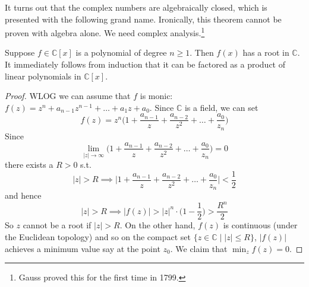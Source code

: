   It turns out that the complex numbers are algebraically closed, which is presented with the following grand name. Ironically, this theorem cannot be proven with algebra alone. We need complex analysis.\footnote{Gauss proved this for the first time in 1799.} 

  \begin{theorem}
    \label{thm:fundamental-theorem-of-algebra}
    Suppose $f \in \mathbb{C}[x]$ is a polynomial of degree $n \geq 1$. Then $f(x)$ has a root in $\mathbb{C}$. It immediately follows from induction that it can be factored as a product of linear polynomials in $\mathbb{C}[x]$. 
  \end{theorem}
  \begin{proof}
    WLOG we can assume that $f$ is monic: $f(z) = z^n + a_{n-1} z^{n-1} + \ldots + a_1 z + a_0$. Since $\mathbb{C}$ is a field, we can set 
    \begin{equation}
      f(z) = z^n \bigg( 1 + \frac{a_{n-1}}{z} + \frac{a_{n-2}}{z^2} + \ldots + \frac{a_0}{z_n} \bigg)
    \end{equation} 
    Since 
    \begin{equation}
      \lim_{|z| \rightarrow \infty} \bigg( 1 + \frac{a_{n-1}}{z} + \frac{a_{n-2}}{z^2} + \ldots + \frac{a_0}{z_n} \bigg) = 0
    \end{equation}
    there exists a $R > 0$ s.t. 
    \begin{equation}
      |z| > R \implies \bigg| 1 + \frac{a_{n-1}}{z} + \frac{a_{n-2}}{z^2} + \ldots + \frac{a_0}{z_n} \bigg| < \frac{1}{2}
    \end{equation}
    and hence 
    \begin{equation}
      |z| > R \implies |f(z)| > |z|^n \cdot \bigg( 1 - \frac{1}{2} \bigg) > \frac{R^n}{2}
    \end{equation}
    So $z$ cannot be a root if $|z| > R$. On the other hand, $f(z)$ is continuous (under the Euclidean topology) and so on the compact set $\{z \in \mathbb{C} \mid |z| \leq R\}$, $|f(z)|$ achieves a minimum value say at the point $z_0$. We claim that $\min_z f(z) = 0$. 


\end{proof}
